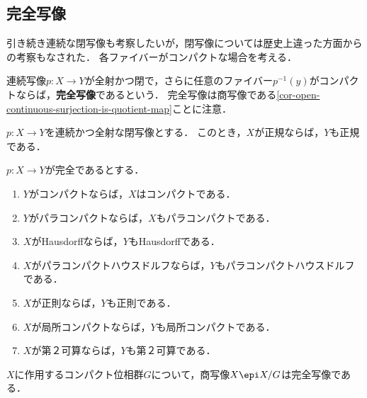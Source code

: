 \documentclass[uplatex,dvipdfmx]{jsreport}
\begin{document}
\subsection{完全写像}

\begin{tcolorbox}[colframe=ForestGreen, colback=ForestGreen!10!white,breakable,colbacktitle=ForestGreen!40!white,coltitle=black,fonttitle=\bfseries\sffamily,
title=各ファイバーがコンパクトな閉写像]
    引き続き連続な閉写像も考察したいが，閉写像については歴史上違った方面からの考察もなされた．
    各ファイバーがコンパクトな場合を考える．
\end{tcolorbox}

\begin{definition}
    連続写像$p:X\to Y$が全射かつ閉で，さらに任意のファイバー$p^{-1}(y)$がコンパクトならば，\textbf{完全写像}であるという．
    完全写像は商写像である\ref{cor-open-continuous-surjection-is-quotient-map}ことに注意．
\end{definition}

\begin{proposition}
    $p:X\to Y$を連続かつ全射な閉写像とする．
    このとき，$X$が正規ならば，$Y$も正規である．
\end{proposition}

\begin{proposition}
    $p:X\to Y$が完全であるとする．
    \begin{enumerate}
        \item $Y$がコンパクトならば，$X$はコンパクトである．
        \item $Y$がパラコンパクトならば，$X$もパラコンパクトである．
        \item $X$がHausdorffならば，$Y$もHausdorffである．
        \item $X$がパラコンパクトハウスドルフならば，$Y$もパラコンパクトハウスドルフである．
        \item $X$が正則ならば，$Y$も正則である．
        \item $X$が局所コンパクトならば，$Y$も局所コンパクトである．
        \item $X$が第２可算ならば，$Y$も第２可算である．
    \end{enumerate}
\end{proposition}

\begin{example}
    $X$に作用するコンパクト位相群$G$について，商写像$X\epi X/G$は完全写像である．
\end{example}
\end{document}
